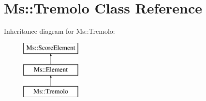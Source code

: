 \hypertarget{class_ms_1_1_tremolo}{}\section{Ms\+:\+:Tremolo Class Reference}
\label{class_ms_1_1_tremolo}
Inheritance diagram for Ms\+:\+:Tremolo\+:\begin{figure}[H]
\begin{center}
\leavevmode
\includegraphics[height=3.000000cm]{class_ms_1_1_tremolo}
\end{center}
\end{figure}
